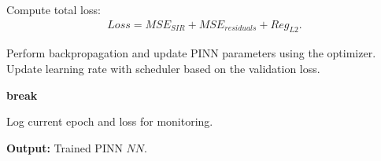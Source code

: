 \documentclass[12pt]{article}
\begin{document}
\begin{algorithm}
\begin{algorithmic}[1]
    \State Compute total loss:
    \begin{align*}
    Loss = MSE_{SIR} + MSE_{residuals} + Reg_{L2}.
    \end{align*}
    
    \State Perform backpropagation and update PINN parameters using the optimizer.
    \State Update learning rate with scheduler based on the validation loss.
    
        \State \textbf{break}
    \EndIf
    
        \State Log current epoch and loss for monitoring.
    \EndIf
\EndFor

\State \textbf{Output:} Trained PINN $NN$.
\end{algorithmic}
\end{algorithm}
\end{document}
